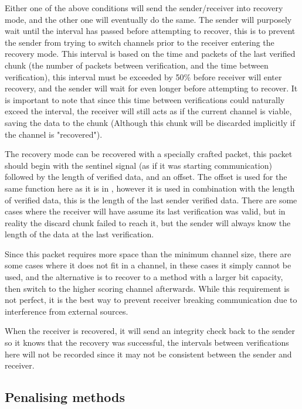 Either one of the above conditions will send the sender/receiver into recovery mode, and the other one will eventually do the same. The sender will purposely wait until the interval has passed before attempting to recover, this is to prevent the sender from trying to switch channels prior to the receiver entering the recovery mode. This interval is based on the time and packets of the last verified chunk (the number of packets between verification, and the time between verification), this interval must be exceeded by 50\% before receiver will enter recovery, and the sender will wait for even longer before attempting to recover. It is important to note that since this time between verifications could naturally exceed the interval, the receiver will still acts as if the current channel is viable, saving the data to the chunk (Although this chunk will be discarded implicitly if the channel is "recovered").

The recovery mode can be recovered with a specially crafted packet, this packet should begin with the sentinel signal (as if it was starting communication) followed by the length of verified data, and an offset. The offset is used for the same function here as it is in , however it is used in combination with the length of verified data, this is the length of the last sender verified data. There are some cases where the receiver will have assume its last verification was valid, but in reality the discard chunk failed to reach it, but the sender will always know the length of the data at the last verification.


Since this packet requires more space than the minimum channel size, there are some cases where it does not fit in a channel, in these cases it simply cannot be used, and the alternative is to recover to a method with a larger bit capacity, then switch to the higher scoring channel afterwards. While this requirement is not perfect, it is the best way to prevent receiver breaking communication due to interference from external sources.

When the receiver is recovered, it will send an integrity check back to the sender so it knows that the recovery was successful, the intervals between verifications here will not be recorded since it may not be consistent between the sender and receiver.

\subsection{Penalising methods}
\label{sec:penalising}


